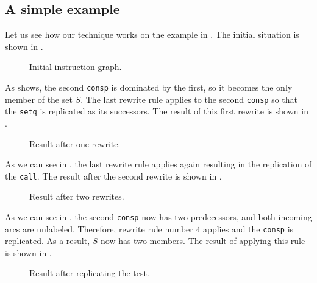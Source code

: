 \subsection{A simple example}
\label{sec-our-technique-example}

Let us see how our technique works on the example in
.  The initial situation is shown in
.

\begin{figure}
\begin{center}
\end{center}
\caption{\label{fig-rewrite-1}
Initial instruction graph.}
\end{figure}

As  shows, the second \texttt{consp} is
dominated by the first, so it becomes the only member of the set $S$.
The last rewrite rule applies to the second \texttt{consp} so that the
\texttt{setq} is replicated as its successors.  The result of this
first rewrite is shown in .

\begin{figure}
\begin{center}
\end{center}
\caption{\label{fig-rewrite-one-and-a-half}
Result after one rewrite.}
\end{figure}

As we can see in , the last rewrite
rule applies again resulting in the replication of the \texttt{call}.
The result after the second rewrite is shown in
.

\begin{figure}
\begin{center}
\end{center}
\caption{\label{fig-rewrite-2}
Result after two rewrites.}
\end{figure}

As we can see in , the second \texttt{consp}
now has two predecessors, and both incoming arcs are unlabeled.
Therefore, rewrite rule number $4$ applies and the \texttt{consp} is
replicated.  As a result, $S$ now has two members.  The result of
applying this rule is shown in .

\begin{figure}
\begin{center}
\end{center}
\caption{\label{fig-rewrite-3}
Result after replicating the test.}
\end{figure}

